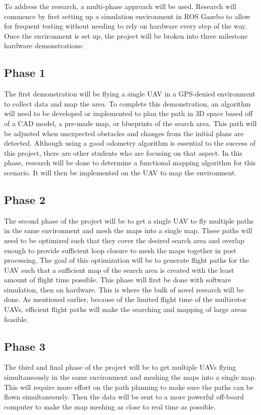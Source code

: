 \documentclass[12pt, letterpaper]{article}
\begin{document}
To address the research, a multi-phase approach will be used. Research will commence by first setting up a simulation environment in ROS Gazebo to allow for frequent testing without needing to rely on hardware every step of the way. Once the environment is set up, the project will be broken into three milestone hardware demonstrations: 

\subsection{Phase 1}
The first demonstration will be flying a single UAV in a GPS-denied environment to collect data and map the area. To complete this demonstration, an algorithm will need to be developed or implemented to plan the path in 3D space based off of a CAD model, a pre-made map, or blueprints of the search area. This path will be adjusted when unexpected obstacles and changes from the initial plans are detected. Although using a good odometry algorithm is essential to the success of this project, there are other students who are focusing on that aspect. In this phase, research will be done to determine a functional mapping algorithm for this scenario. It will then be implemented on the UAV to map the environment. 

\subsection{Phase 2}
The second phase of the project will be to get a single UAV to fly multiple paths in the same environment and mesh the maps into a single map. These paths will need to be optimized such that they cover the desired search area and overlap enough to provide sufficient loop closure to mesh the maps together in post processing. The goal of this optimization will be to generate flight paths for the UAV such that a sufficient map of the search area is created with the least amount of flight time possible. This phase will first be done with software simulation, then on hardware. This is where the bulk of novel research will be done. As mentioned earlier, because of the limited flight time of the multirotor UAVs, efficient flight paths will make the searching and mapping of large areas feasible.

\subsection{Phase 3}
The third and final phase of the project will be to get multiple UAVs flying simultaneously in the same environment and meshing the maps into a single map. This will require more effort on the path planning to make sure the paths can be flown simultaneously. Then the data will be sent to a more powerful off-board computer to make the map meshing as close to real time as possible. 
\end{document}
